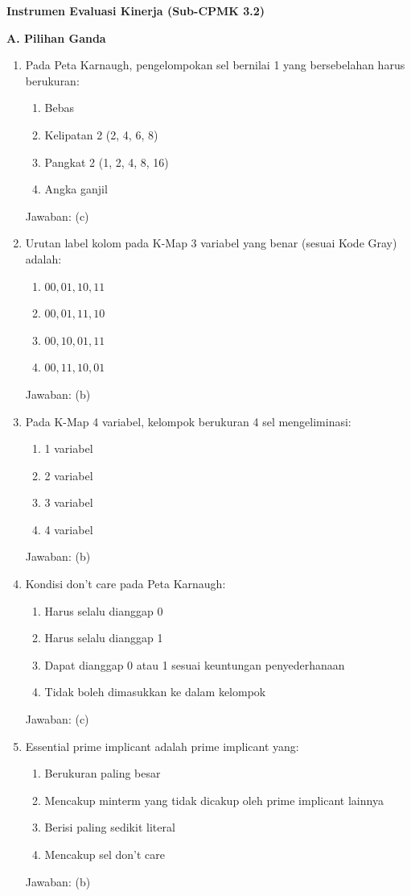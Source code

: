 \documentclass[../main]{subfiles}
\begin{document}
\begin{asesmen}
\textbf{Instrumen Evaluasi Kinerja (Sub-CPMK 3.2)}

\textbf{A. Pilihan Ganda}
\begin{enumerate}
  \item Pada Peta Karnaugh, pengelompokan sel bernilai 1 yang bersebelahan harus berukuran:
  \begin{enumerate}
    \item Bebas
    \item Kelipatan 2 (2, 4, 6, 8)
    \item Pangkat 2 (1, 2, 4, 8, 16)
    \item Angka ganjil
  \end{enumerate}
  Jawaban: (c)

  \item Urutan label kolom pada K-Map 3 variabel yang benar (sesuai Kode Gray) adalah:
  \begin{enumerate}
    \item $00, 01, 10, 11$
    \item $00, 01, 11, 10$
    \item $00, 10, 01, 11$
    \item $00, 11, 10, 01$
  \end{enumerate}
  Jawaban: (b)

  \item Pada K-Map 4 variabel, kelompok berukuran 4 sel mengeliminasi:
  \begin{enumerate}
    \item 1 variabel
    \item 2 variabel
    \item 3 variabel
    \item 4 variabel
  \end{enumerate}
  Jawaban: (b)

  \item Kondisi don't care pada Peta Karnaugh:
  \begin{enumerate}
    \item Harus selalu dianggap 0
    \item Harus selalu dianggap 1
    \item Dapat dianggap 0 atau 1 sesuai keuntungan penyederhanaan
    \item Tidak boleh dimasukkan ke dalam kelompok
  \end{enumerate}
  Jawaban: (c)

  \item Essential prime implicant adalah prime implicant yang:
  \begin{enumerate}
    \item Berukuran paling besar
    \item Mencakup minterm yang tidak dicakup oleh prime implicant lainnya
    \item Berisi paling sedikit literal
    \item Mencakup sel don't care
  \end{enumerate}
  Jawaban: (b)
\end{enumerate}


\end{asesmen}
\end{document}
